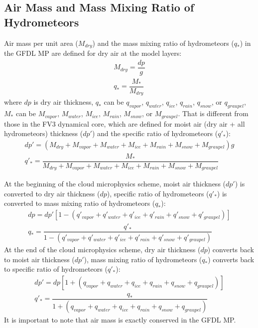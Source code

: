 \documentclass[letterpaper,titlepage,10pt]{article}
\numberwithin{equation}{section}
\begin{document}

\subsection{Air Mass and Mass Mixing Ratio of Hydrometeors}

Air mass per unit area ($M_{dry}$) and the mass mixing ratio of hydrometeors ($q_*$) in the GFDL MP are defined for dry air at the model layers:
\begin{gather}
	M_{dry} = \dfrac{dp}{g} \\
	q_* = \dfrac{M_{*}}{M_{dry}}
\end{gather}
where $dp$ is dry air thickness, $q_*$ can be $q_{vapor}$, $q_{water}$, $q_{ice}$, $q_{rain}$, $q_{snow}$, or $q_{graupel}$, $M_*$ can be $M_{vapor}$, $M_{water}$, $M_{ice}$, $M_{rain}$, $M_{snow}$, or $M_{graupel}$. That is different from those in the FV3 dynamical core, which are defined for moist air (dry air + all hydrometeors) thickness ($dp'$) and the specific ratio of hydrometeors ($q'_*$):
\begin{gather}
	dp' = \left(M_{dry} + M_{vapor} + M_{water} + M_{ice} + M_{rain} + M_{snow} + M_{graupel}\right)g \\
	q'_* = \dfrac{M_{*}}{M_{dry} + M_{vapor} + M_{water} + M_{ice} + M_{rain} + M_{snow} + M_{graupel}}
\end{gather}

At the beginning of the cloud microphysics scheme, moist air thickness ($dp'$) is converted to dry air thickness ($dp$), specific ratio of hydrometeors ($q'_*$) is converted to mass mixing ratio of hydrometeors ($q_*$):
\begin{gather}
	dp = dp' \left[1 - \left(q'_{vapor} + q'_{water} + q'_{ice} + q'_{rain} + q'_{snow} + q'_{graupel} \right) \right] \\
	q_* = \dfrac{q'_*}{1 - \left(q'_{vapor} + q'_{water} + q'_{ice} + q'_{rain} + q'_{snow} + q'_{graupel} \right)}
\end{gather}
At the end of the cloud microphysics scheme, dry air thickness ($dp$) converts back to moist air thickness ($dp'$), mass mixing ratio of hydrometeors ($q_*$) converts back to specific ratio of hydrometeors ($q'_*$):
\begin{gather}
	dp' = dp \left[1 + \left(q_{vapor} + q_{water} + q_{ice} + q_{rain} + q_{snow} + q_{graupel} \right) \right] \\
	q'_* = \dfrac{q_*}{1 + \left(q_{vapor} + q_{water} + q_{ice} + q_{rain} + q_{snow} + q_{graupel} \right)}
\end{gather}
It is important to note that air mass is exactly conserved in the GFDL MP.
\end{document}
